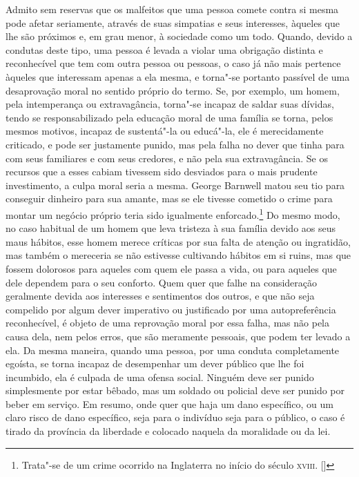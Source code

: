 Admito sem reservas que os malfeitos que uma pessoa comete contra si
mesma pode afetar seriamente, através de suas simpatias e seus
interesses, àqueles que lhe são próximos e, em grau menor, à sociedade
como um todo. Quando, devido a condutas deste tipo, uma pessoa é levada
a violar uma obrigação distinta e reconhecível que tem com outra pessoa
ou pessoas, o caso já não mais pertence àqueles que interessam apenas a
ela mesma, e torna"-se portanto passível de uma desaprovação moral no
sentido próprio do termo. Se, por exemplo, um homem, pela intemperança
ou extravagância, torna"-se incapaz de saldar suas dívidas, tendo se
responsabilizado pela educação moral de uma família se torna, pelos
mesmos motivos, incapaz de sustentá"-la ou educá"-la, ele é
merecidamente criticado, e pode ser justamente punido, mas pela falha
no dever que tinha para com seus familiares e com seus credores, e não
pela sua extravagância. Se os recursos que a esses cabiam tivessem sido
desviados para o mais prudente investimento, a culpa moral seria a
mesma. George Barnwell matou seu tio para conseguir dinheiro para sua
amante, mas se ele tivesse cometido o crime para montar um negócio
próprio teria sido igualmente
enforcado.\footnote{ Trata"-se de um crime ocorrido na Inglaterra 
no início do século \textsc{xviii}. []}
 Do mesmo modo, no caso habitual de um homem que leva tristeza à sua
família devido aos seus maus hábitos, esse homem merece críticas por
sua falta de atenção ou ingratidão, mas também o mereceria se não
estivesse cultivando hábitos em si ruins, mas que fossem dolorosos para
aqueles com quem ele passa a vida, ou para aqueles que dele dependem
para o seu conforto. Quem quer que falhe na consideração geralmente
devida aos interesses e sentimentos dos outros, e que não seja
compelido por algum dever imperativo ou justificado por uma
autopreferência reconhecível, é objeto de uma reprovação moral por
essa falha, mas não pela causa dela, nem pelos erros, que são meramente
pessoais, que podem ter levado a ela. Da mesma maneira, quando uma
pessoa, por uma conduta completamente egoísta, se torna incapaz de
desempenhar um dever público que lhe foi incumbido, ela é culpada de uma
ofensa social. Ninguém deve ser punido simplesmente por estar bêbado,
mas um soldado ou policial deve ser punido por beber em serviço. Em
resumo, onde quer que haja um dano específico, ou um claro risco de
dano específico, seja para o indivíduo seja para o público, o caso é
tirado da província da liberdade e colocado naquela da moralidade ou da lei. 

